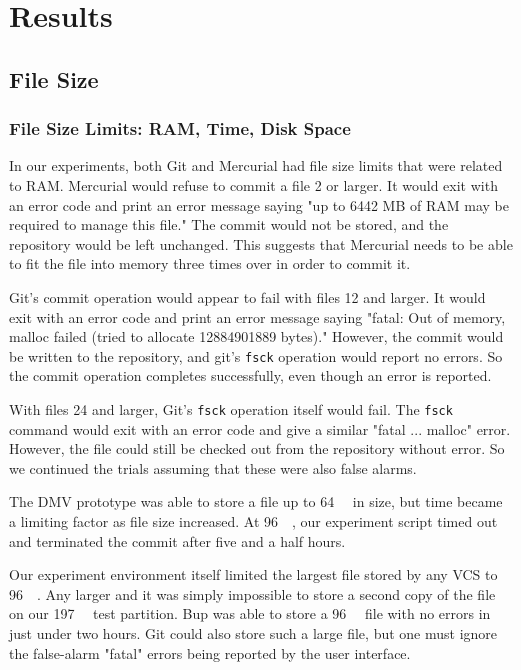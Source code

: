 \section{Results}

\subsection{File Size}

\subsubsection{File Size Limits: RAM, Time, Disk Space}


In our experiments, both Git and Mercurial had file size limits that were related to RAM.
Mercurial would refuse to commit a file \SI{2}{\gib} or larger.
It would exit with an error code and print an error message saying "up to 6442 MB of RAM may be required to manage this file."
The commit would not be stored, and the repository would be left unchanged.
This suggests that Mercurial needs to be able to fit the file into memory three times over in order to commit it.

Git's commit operation would appear to fail with files \SI{12}{\gib} and larger.
It would exit with an error code and print an error message saying "fatal: Out of memory, malloc failed (tried to allocate 12884901889 bytes)."
However, the commit would be written to the repository, and git's \lstinline{fsck} operation would report no errors.
So the commit operation completes successfully, even though an error is reported.

With files \SI{24}{\gib} and larger, Git's \lstinline{fsck} operation itself would fail.
The \lstinline{fsck} command would exit with an error code and give a similar "fatal ... malloc" error.
However, the file could still be checked out from the repository without error.
So we continued the trials assuming that these were also false alarms.

The \gls{DMV} prototype was able to store a file up to \SI{64}{\gibi\byte} in size, but time became a limiting factor as file size increased.
At \SI{96}{\gibi\byte}, our experiment script timed out and terminated the \gls{commit} after five and a half hours.

Our experiment environment itself limited the largest file stored by any \gls{VCS} to \SI{96}{\gibi\byte}.
Any larger and it was simply impossible to store a second copy of the file on our \SI{197}{\gibi\byte} test partition.
Bup was able to store a \SI{96}{\gibi\byte} file with no errors in just under two hours.
Git could also store such a large file, but one must ignore the false-alarm "fatal" errors being reported by the user interface.

